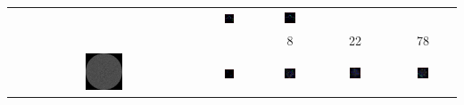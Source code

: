 \documentclass[10pt,a4paper,oneside]{article}
\theoremstyle{definition}
\begin{document}
\begin{table}[p]
\begin{tabular}{c c c c c}
& 
    \includegraphics[width=0.2\textwidth]{../img/runs2d/koch2/generation0022.png}
& 
    \includegraphics[width=0.2\textwidth]{../img/runs2d/koch2/generation0078.png}
\\    
 &  & 8 & 22 & 78 \\
	\includegraphics[width=0.2\textwidth]{../img/runs2d/ball/data.png}
& 
    \includegraphics[width=0.2\textwidth]{../img/runs2d/ball/generation0000.png}
& 
    \includegraphics[width=0.2\textwidth]{../img/runs2d/ball/generation0003.png}
& 
    \includegraphics[width=0.2\textwidth]{../img/runs2d/ball/generation0024.png}
& 
    \includegraphics[width=0.2\textwidth]{../img/runs2d/ball/generation0072.png}

\end{tabular}
\end{table}
\end{document}
